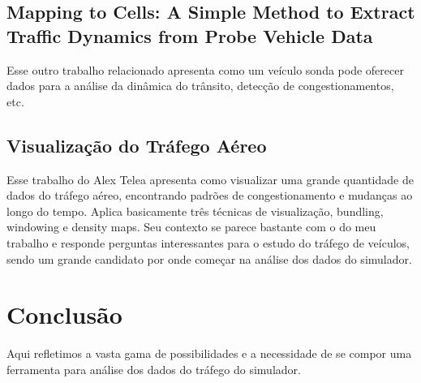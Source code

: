 \subsection{Mapping to Cells: A Simple Method to Extract Traffic Dynamics from Probe Vehicle Data}
 Esse outro trabalho relacionado apresenta como um veículo sonda pode oferecer
dados para a análise da dinâmica do trânsito, detecção de congestionamentos, etc.

\subsection{Visualização do Tráfego Aéreo}

 Esse trabalho do Alex Telea apresenta como visualizar uma grande quantidade
de dados do tráfego aéreo, encontrando padrões de congestionamento e mudanças
ao longo do tempo. Aplica basicamente três técnicas de visualização, bundling,
windowing e density maps. Seu contexto se parece bastante com o do meu trabalho
e responde perguntas interessantes para o estudo do tráfego de veículos, sendo
um grande candidato por onde começar na análise dos dados do simulador. 


%
%
%  
%
%


\section{Conclusão}

Aqui refletimos a vasta gama de possibilidades e a necessidade de se compor
uma ferramenta para análise dos dados do tráfego do simulador.

